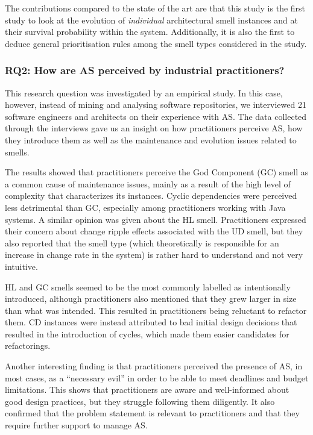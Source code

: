 The contributions compared to the state of the art are that this study is the first study to look at the evolution of \emph{individual} architectural smell instances and at their survival probability within the system.
Additionally, it is also the first to deduce general prioritisation rules among the smell types considered in the study.

\subsubsection*{RQ2: How are AS perceived by industrial practitioners?}
This research question was investigated by an empirical study.
In this case, however, instead of mining and analysing software repositories, we interviewed 21 software engineers and architects on their experience with AS.
The data collected through the interviews gave us an insight on how practitioners perceive AS, how they introduce them as well as the maintenance and evolution issues related to smells. 

The results showed that practitioners perceive the God Component (GC) smell as a common cause of maintenance issues, mainly as a result of the high level of complexity that characterizes its instances. 
Cyclic dependencies were perceived less detrimental than GC, especially among practitioners working with Java systems. A similar opinion was given about the HL smell.
Practitioners expressed their concern about change ripple effects associated with the UD smell, but they also reported that the smell type (which theoretically is responsible for an increase in change rate in the system) is rather hard to understand and not very intuitive. 

HL and GC smells seemed to be the most commonly labelled as intentionally introduced, although practitioners also mentioned that they grew larger in size than what was intended.
This resulted in practitioners being reluctant to refactor them.
CD instances were instead attributed to bad initial design decisions that resulted in the introduction of cycles, which made them easier candidates for refactorings.

Another interesting finding is that practitioners perceived the presence of AS, in most cases, as a ``necessary evil'' in order to be able to meet deadlines and budget limitations.
This shows that practitioners are aware and well-informed about good design practices, but they struggle following them diligently.
It also confirmed that the problem statement is relevant to practitioners and that they require further support to manage AS.

